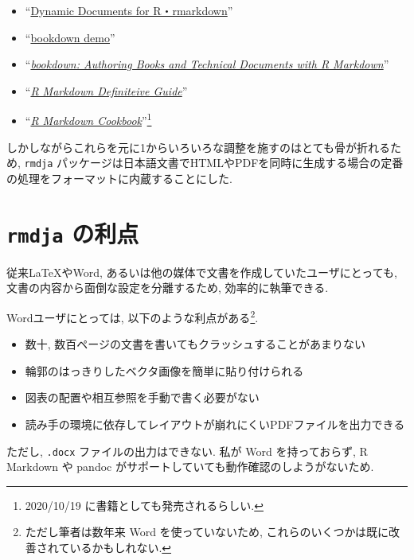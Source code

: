 \documentclass[
]{bxjsbook}
\providecommand{\tightlist}{%
  \setlength{\itemsep}{0pt}\setlength{\parskip}{0pt}}
\theoremstyle{definition}
\theoremstyle{definition}
\theoremstyle{definition}
\theoremstyle{remark}
\begin{document}
\begin{itemize}
\tightlist
\item
  ``\href{https://rmarkdown.rstudio.com/docs/index.html}{Dynamic
  Documents for R・rmarkdown}''
\item
  ``\href{https://github.com/rstudio/bookdown-demo}{bookdown demo}''
\item
  ``\href{https://bookdown.org/yihui/bookdown/}{\emph{bookdown:
  Authoring Books and Technical Documents with R Markdown}}''
\item
  ``\href{https://bookdown.org/yihui/rmarkdown/}{\emph{R Markdown
  Definiteive Guide}}''
\item
  ``\href{https://bookdown.org/yihui/rmarkdown-cookbook}{\emph{R
  Markdown Cookbook}}''\footnote{2020/10/19
    に書籍としても発売されるらしい.}
\end{itemize}

しかしながらこれらを元に1からいろいろな調整を施すのはとても骨が折れるため,
\texttt{rmdja}
パッケージは日本語文書でHTMLやPDFを同時に生成する場合の定番の処理をフォーマットに内蔵することにした.

\hypertarget{rmdja-ux306eux5229ux70b9}{%
\section*{\texorpdfstring{\texttt{rmdja}
の利点}{rmdja の利点}}\label{rmdja-ux306eux5229ux70b9}}

従来LaTeXやWord, あるいは他の媒体で文書を作成していたユーザにとっても,
文書の内容から面倒な設定を分離するため, 効率的に執筆できる.

Wordユーザにとっては, 以下のような利点がある\footnote{ただし筆者は数年来
  Word を使っていないため,
  これらのいくつかは既に改善されているかもしれない.}.

\begin{itemize}
\tightlist
\item
  数十, 数百ページの文書を書いてもクラッシュすることがあまりない
\item
  輪郭のはっきりしたベクタ画像を簡単に貼り付けられる
\item
  図表の配置や相互参照を手動で書く必要がない
\item
  読み手の環境に依存してレイアウトが崩れにくいPDFファイルを出力できる
\end{itemize}

ただし, \texttt{.docx} ファイルの出力はできない. 私が Word
を持っておらず, R Markdown や pandoc
がサポートしていても動作確認のしようがないため.
\end{document}
